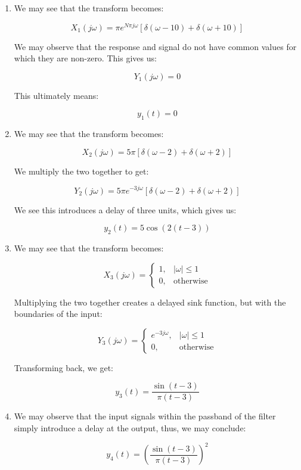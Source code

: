 \begin{enumerate}
\begin{enumerate}
      \item We may see that the transform becomes:

        $$X_1(j\omega)=\pi e^{N\pi j\omega}\left[ \delta(\omega-10)+\delta(\omega+10) \right]$$

        We may observe that the response and signal do not have common values for which they are non-zero. This gives us:

        $$Y_1(j\omega)=0$$

        This ultimately means:

        $$\boxed{y_1(t)=0}$$

      \item We may see that the transform becomes:

        $$X_2(j\omega)=5\pi\left[ \delta(\omega-2)+\delta(\omega+2) \right]$$

        We multiply the two together to get:

        $$Y_2(j\omega)=5\pi e^{-3j\omega}\left[  \delta(\omega-2)+\delta(\omega+2)\right]$$

        We see this introduces a delay of three units, which gives us:

        $$\boxed{y_2(t)=5\cos(2(t-3))}$$

      \item We may see that the transform becomes:

        $$X_3(j\omega)=\left\{\begin{array}{ll} 1,&|\omega|\leq1\\0,&\text{otherwise}\end{array}$$

          Multiplying the two together creates a delayed sink function, but with the boundaries of the input:

        $$Y_3(j\omega)=\left\{\begin{array}{ll} e^{-3j\omega},&|\omega|\leq1\\0,&\text{otherwise}\end{array}$$

          Transforming back, we get:

          $$\boxed{y_3(t)=\frac{\sin(t-3)}{\pi(t-3)}}$$

        \item We may observe that the input signals within the passband of the filter simply introduce a delay at the output, thus, we may conclude:

          $$\boxed{y_4(t)=\left( \frac{\sin(t-3)}{\pi(t-3)} \right)^2}$$


\end{enumerate}
\end{enumerate}

